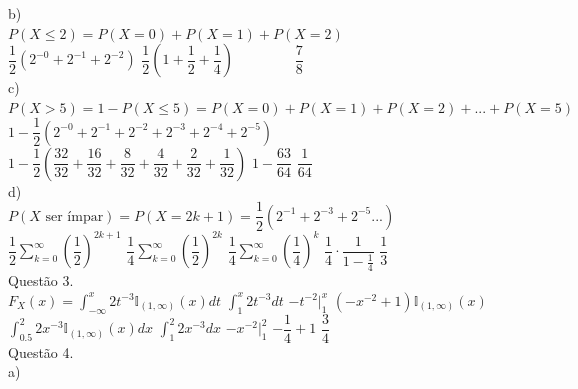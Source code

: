\documentclass[12pt]{article}
\begin{document}
\noindent b)\\

$P(X\leq2)=P(X=0)+P(X=1)+P(X=2)$\\

$\dfrac{1}{2}\left(2^{-0}+2^{-1}+2^{-2}\right)$\qquad\qquad
$\dfrac{1}{2}\left(1+\dfrac{1}{2}+\dfrac{1}{4}\right)\qquad\qquad$
$\dfrac{7}{8}$\\

\noindent c)\\

$P(X>5)=1-P(X\leq5)=P(X=0)+P(X=1)+P(X=2)+...+P(X=5)$\\

$1-\dfrac{1}{2}\left(2^{-0}+2^{-1}+2^{-2}+2^{-3}+2^{-4}+2^{-5}\right)$\\

$1-\dfrac{1}{2}\left(\dfrac{32}{32}+\dfrac{16}{32}+\dfrac{8}{32}+\dfrac{4}{32}+\dfrac{2}{32}+\dfrac{1}{32}\right)$\qquad\qquad
$1-\dfrac{63}{64}$\qquad\qquad
$\dfrac{1}{64}$\\

\noindent d)\\

$P(X\text{ ser ímpar})=P(X=2k+1)=\dfrac{1}{2}(2^{-1}+2^{-3}+2^{-5}...)$\\

$\dfrac{1}{2}\displaystyle\sum_{k=0}^{\infty}\left(\dfrac{1}{2}\right)^{2k+1}$\qquad\qquad
$\displaystyle\dfrac{1}{4}\sum_{k=0}^{\infty}\left(\dfrac{1}{2}\right)^{2k}$\qquad\qquad
$\displaystyle\dfrac{1}{4}\sum_{k=0}^{\infty}\left(\dfrac{1}{4}\right)^k$\qquad\qquad
$\dfrac{1}{4}\cdot\dfrac{1}{1-\frac{1}{4}}$\qquad\qquad
$\dfrac{1}{3}$\\

\noindent Questão 3.\\

$F_{X}(x)=\displaystyle\int_{-\infty}^{x}2t^{-3}\mathds{I}_{(1,\infty)}(x)dt$\qquad\qquad
$\displaystyle\int_{1}^{x}2t^{-3}dt$\qquad\qquad
$-t^{-2}\biggr|_{1}^{x}$\qquad\qquad
$(-x^{-2}+1)\mathds{I}_{(1,\infty)}(x)$\\

$\displaystyle\int_{0.5}^{2}2x^{-3}\mathds{I}_{(1,\infty)}(x)dx$\qquad\qquad
$\displaystyle\int_{1}^{2}2x^{-3}dx$\qquad\qquad
$-x^{-2}\biggr|_{1}^{2}$\qquad\qquad
$-\dfrac{1}{4}+1$\qquad\qquad
$\dfrac{3}{4}$\\

\noindent Questão 4.\\

\noindent a)\\
\end{document}
